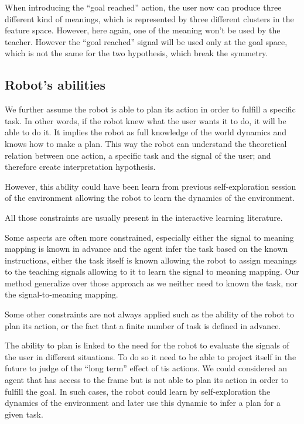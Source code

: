 
When introducing the ``goal reached'' action, the user now can produce three different kind of meanings, which is represented by three different clusters in the feature space. However, here again, one of the meaning won't be used by the teacher. However the ``goal reached'' signal will be used only at the goal space, which is not the same for the two hypothesis, which break the symmetry.


\subsection{Robot's abilities}

We further assume the robot is able to plan its action in order to fulfill a specific task. In other words, if the robot knew what the user wants it to do, it will be able to do it. It implies the robot as full knowledge of the world dynamics and knows how to make a plan. This way the robot can understand the theoretical relation between one action, a specific task and the signal of the user; and therefore create interpretation hypothesis.

However, this ability could have been learn from previous self-exploration session of the environment allowing the robot to learn the dynamics of the environment.

\transition

All those constraints are usually present in the interactive learning literature. 

Some aspects are often more constrained, especially either the signal to meaning mapping is known in advance and the agent infer the task based on the known instructions, either the task itself is known allowing the robot to assign meanings to the teaching signals allowing to it to learn the signal to meaning mapping. Our method generalize over those approach as we neither need to known the task, nor the signal-to-meaning mapping.

Some other constraints are not always applied such as the ability of the robot to plan its action, or the fact that a finite number of task is defined in advance. 

The ability to plan is linked to the need for the robot to evaluate the signals of the user in different situations. To do so it need to be able to project itself in the future to judge of the ``long term'' effect of tis actions. We could considered an agent that has access to the frame but is not able to plan its action in order to fulfill the goal. In such cases, the robot could learn by self-exploration the dynamics of the environment and later use this dynamic to infer a plan for a given task.

